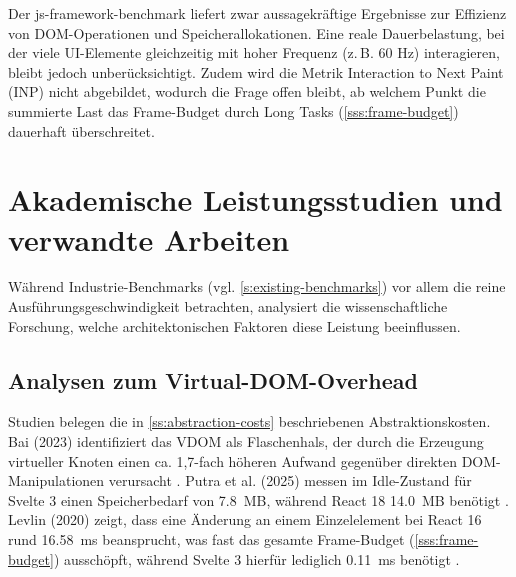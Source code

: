 Der js-framework-benchmark liefert zwar aussagekräftige Ergebnisse zur Effizienz von DOM-Operationen und Speicherallokationen. Eine reale Dauerbelastung, bei der viele UI-Elemente gleichzeitig mit hoher Frequenz (z.\,B. 60 Hz) interagieren, bleibt jedoch unberücksichtigt. Zudem wird die Metrik Interaction to Next Paint (INP) nicht abgebildet, wodurch die Frage offen bleibt, ab welchem Punkt die summierte Last das Frame-Budget durch Long Tasks (\cref{sss:frame-budget}) dauerhaft überschreitet.

\section{Akademische Leistungsstudien und verwandte Arbeiten}
\label{s:academic-studies}
Während Industrie-Benchmarks (vgl. \cref{s:existing-benchmarks}) vor allem die reine Ausführungsgeschwindigkeit betrachten, analysiert die wissenschaftliche Forschung, welche architektonischen Faktoren diese Leistung beeinflussen. 

\subsection{Analysen zum Virtual-DOM-Overhead}
Studien belegen die in \cref{ss:abstraction-costs} beschriebenen Abstraktionskosten. Bai (2023) identifiziert das VDOM als Flaschenhals, der durch die Erzeugung virtueller Knoten einen ca. 1,7-fach höheren Aufwand gegenüber direkten DOM-Manipulationen verursacht \cite{bai-millionjs-2023}. Putra et al. (2025) messen im Idle-Zustand für Svelte 3 einen Speicherbedarf von \qty{7,8}{MB}, während React 18 \qty{14,0}{MB} benötigt \cite{putra-performance-2025}. Levlin (2020) zeigt, dass eine Änderung an einem Einzelelement bei React 16 rund \qty{16,58}{ms} beansprucht, was fast das gesamte Frame-Budget (\cref{sss:frame-budget}) ausschöpft, während Svelte 3 hierfür lediglich \qty{0,11}{ms} benötigt \cite{levlin-dom-benchmark-2020}.

